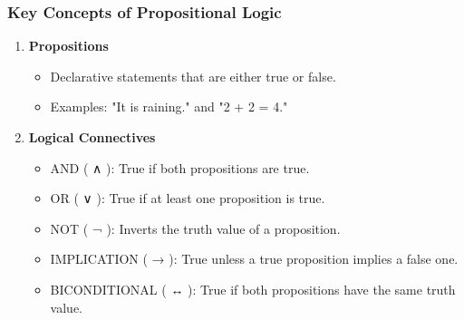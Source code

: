 \documentclass[aspectratio=169]{beamer}
\begin{document}
\begin{frame}[fragile]
    \frametitle{Key Concepts of Propositional Logic}
    \begin{enumerate}
        \item \textbf{Propositions}
        \begin{itemize}
            \item Declarative statements that are either true or false.
            \item Examples: "It is raining." and "2 + 2 = 4."
        \end{itemize}

        \item \textbf{Logical Connectives}
        \begin{itemize}
            \item AND ( ∧ ): True if both propositions are true.
            \item OR ( ∨ ): True if at least one proposition is true.
            \item NOT ( ¬ ): Inverts the truth value of a proposition.
            \item IMPLICATION ( → ): True unless a true proposition implies a false one.
            \item BICONDITIONAL ( ↔ ): True if both propositions have the same truth value.
        \end{itemize}
    \end{enumerate}
\end{frame}
\end{document}
